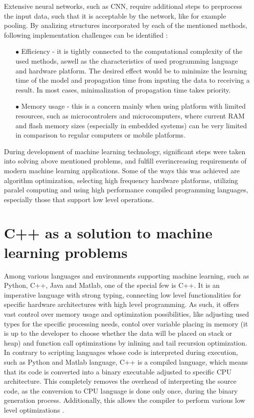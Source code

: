 Extensive neural networks, such as CNN, require additional steps to preprocess the input data, such that it is acceptable by the network, like for example pooling. By analizing structures incorporated by each of the mentioned methods, following implementation challenges can be identified \cite{constrained}:

\newpage
\begin{itemize}
    \item [$\bullet$] Efficiency - it is tightly connected to the computational complexity of the used methods, aswell as the characteristics of used programming language and hardware platform. The desired effect would be to minimize the learning time of the model and propagation time from inputing the data to receiving a result. In most cases, minimalization of propagation time takes priority.
    
    \item [$\bullet$] Memory usage - this is a concern mainly when using platform with limited resources, such as microcontrolers and microcomputers, where current RAM and flash memory sizes (especially in embedded systems) can be very limited in comparison to regular computers or mobile platforms.
\end{itemize}

During development of machine learning technology, significant steps were taken into solving above mentioned problems, and fulfill everincreasing requirements of modern machine learning applications. Some of the ways this was achieved are algorithm optimization, selecting high frequency hardware platforms, utilizing paralel computing and using high performance compiled programming languages, especially those that support low level operations. 

\section{C++ as a solution to machine learning problems}

Among various languages and environments supporting machine learning, such as Python, C++, Java and Matlab, one of the special few is C++. It is an imperative language with strong typing, connecting low level functionalities for specific hardware architectures with high level programming. As such, it offers vast control over memory usage and optimization possibilities, like adjusting used types for the specific processing needs, contol over variable placing in memory (it is up to the developer to choose whether the data will be placed on stack or heap) and function call optimizations by inlining and tail recursion optimization. In contrary to scripting languages whose code is interpreted during execution, such as Python and Matlab language, C++ is a compiled language, which means that its code is converted into a binary executable adjusted to specific CPU architecture. This completely removes the overhead of interpreting the source code, as the conversion to CPU language is done only once, during the binary generation process. Additionally, this allows the compiler to perform various low level optimizations \cite{cpp_char}.

